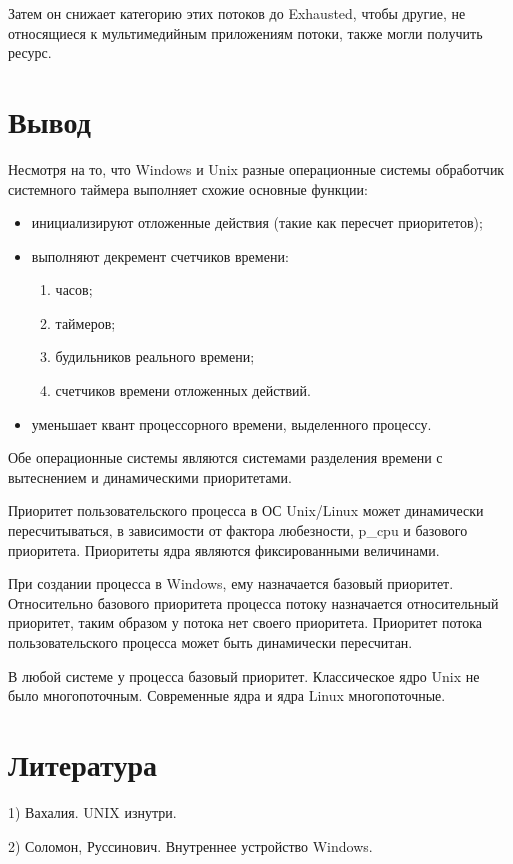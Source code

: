 Затем он снижает категорию этих потоков до Exhausted,
чтобы другие, не относящиеся к мультимедийным
приложениям потоки, также могли получить ресурс.

\newpage

\section{Вывод}

Несмотря на то, что Windows и Unix разные операционные системы
обработчик системного таймера выполняет
схожие основные функции:

\begin{itemize}
	\item инициализируют отложенные действия (такие как пересчет приоритетов);
	\item выполняют декремент счетчиков времени:
	      \begin{enumerate}
		      \item часов;
		      \item таймеров;
		      \item будильников реального времени;
		      \item счетчиков времени отложенных действий.
	      \end{enumerate}
	\item уменьшает квант процессорного времени, выделенного процессу.
\end{itemize}

Обе операционные системы являются системами
разделения времени с вытеснением и динамическими приоритетами.

Приоритет пользовательского процесса в ОС Unix/Linux
может динамически пересчитываться, в зависимости от
фактора любезности, p\_cpu и базового приоритета. 
Приоритеты ядра являются фиксированными величинами.

При создании процесса в Windows, ему назначается базовый приоритет. 
Относительно базового приоритета процесса потоку назначается
относительный приоритет, таким образом у потока нет своего приоритета.
Приоритет потока пользовательского процесса может быть динамически пересчитан.

В любой системе у процесса базовый приоритет. 
Классическое ядро Unix не было многопоточным. 
Современные ядра и ядра Linux многопоточные.

\newpage

\section{Литература}

1) Вахалия. UNIX изнутри.

2) Соломон, Руссинович. Внутреннее устройство Windows.

